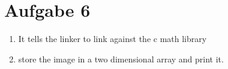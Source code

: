 \documentclass[a4paper,10pt]{article}
\begin{document}
\section*{Aufgabe 6}
\begin{enumerate}
 \item It tells the linker to link against the c math library
 \item store the image in a two dimensional array and print it.
\end{enumerate}
\end{document}
